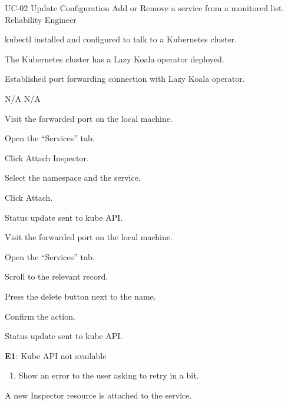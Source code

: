 \UseCaseDescription
{UC-02}
{Update Configuration}
{Add or Remove a service from a monitored list.}
{Reliability Engineer}
{\begin{CompactItemizes}
    \item kubectl installed and configured to talk to a Kubernetes cluster.
    \item The Kubernetes cluster has a Lazy Koala operator deployed.
    \item Established port forwarding connection with Lazy Koala operator.
\end{CompactItemizes}}
{N/A}
{N/A}
{\begin{CompactEnumerate}
    \item Visit the forwarded port on the local machine.
    \item Open the “Services” tab.
    \item Click Attach Inspector.
    \item Select the namespace and the service.
    \item Click Attach.
    \item Status update sent to kube API.
\end{CompactEnumerate}}
{{\begin{CompactEnumerate}
    \item Visit the forwarded port on the local machine.
    \item Open the “Services” tab.
    \item Scroll to the relevant record.
    \item Press the delete button next to the name.
    \item Confirm the action.
    \item Status update sent to kube API.
\end{CompactEnumerate}}
{\textbf{E1}: Kube API not available
\vspace{-4mm}\begin{enumerate}
    \item Show an error to the user asking to retry in a bit.
\vspace{-7mm}\end{enumerate}}
{\begin{CompactItemizes}
    \item A new Inspector resource is attached to the service.
\end{CompactItemizes}}}

